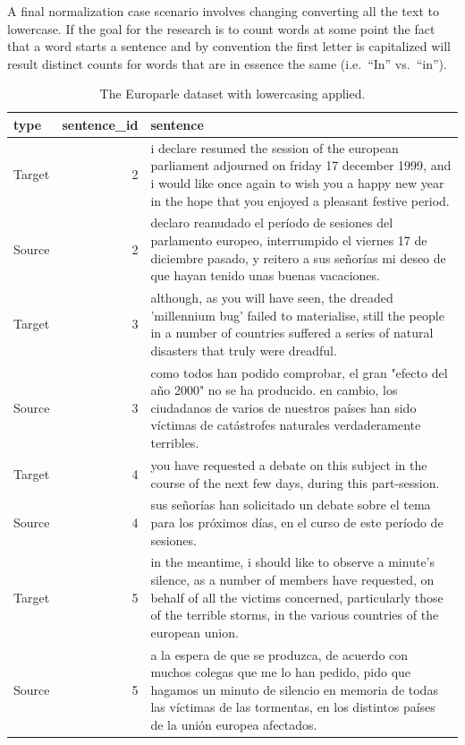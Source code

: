 \documentclass[
]{article}
\begin{document}
A final normalization case scenario involves changing converting all the text to lowercase. If the goal for the research is to count words at some point the fact that a word starts a sentence and by convention the first letter is capitalized will result distinct counts for words that are in essence the same (i.e.~``In'' vs.~``in'').

\begin{table}

\caption{\label{tab:normalize-lowercase-europarle}The Europarle dataset with lowercasing applied.}
\centering
\begin{tabular}[t]{lrl}
\toprule
type & sentence\_id & sentence\\
\midrule
Target & 2 & i declare resumed the session of the european parliament adjourned on friday 17 december 1999, and i would like once again to wish you a happy new year in the hope that you enjoyed a pleasant festive period.\\
Source & 2 & declaro reanudado el período de sesiones del parlamento europeo, interrumpido el viernes 17 de diciembre pasado, y reitero a sus señorías mi deseo de que hayan tenido unas buenas vacaciones.\\
Target & 3 & although, as you will have seen, the dreaded 'millennium bug' failed to materialise, still the people in a number of countries suffered a series of natural disasters that truly were dreadful.\\
Source & 3 & como todos han podido comprobar, el gran "efecto del año 2000" no se ha producido. en cambio, los ciudadanos de varios de nuestros países han sido víctimas de catástrofes naturales verdaderamente terribles.\\
Target & 4 & you have requested a debate on this subject in the course of the next few days, during this part-session.\\
\addlinespace
Source & 4 & sus señorías han solicitado un debate sobre el tema para los próximos días, en el curso de este período de sesiones.\\
Target & 5 & in the meantime, i should like to observe a minute's silence, as a number of members have requested, on behalf of all the victims concerned, particularly those of the terrible storms, in the various countries of the european union.\\
Source & 5 & a la espera de que se produzca, de acuerdo con muchos colegas que me lo han pedido, pido que hagamos un minuto de silencio en memoria de todas las víctimas de las tormentas, en los distintos países de la unión europea afectados.\\

\end{tabular}
\end{table}
\end{document}
